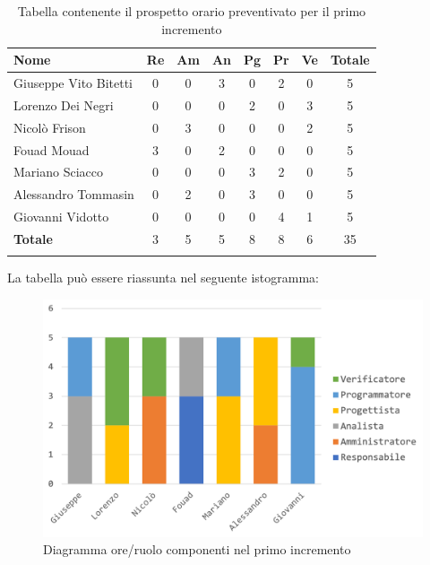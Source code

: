 			\begin{longtable}{|l|c|c|c|c|c|c|c|}
				\hline
				\rowcolor{lighter-grayer}
				\textbf{Nome} & \textbf{Re} & \textbf{Am} & \textbf{An} & \textbf{Pg}  & \textbf{Pr}   & \textbf{Ve} & \textbf{Totale} \\
				\hline
				\endfirsthead
				
				\hline
				Giuseppe Vito Bitetti 		 & 0 & 0 & 3 & 0 & 2 & 0 & 5\\
				\hline
				\hline
				Lorenzo Dei Negri			 & 0 & 0 & 0 & 2 & 0 & 3 & 5\\
				\hline
				\hline
				Nicolò Frison				    & 0 & 3 & 0 & 0 & 0 & 2 & 5\\
				\hline
				\hline
				Fouad Mouad 				 & 3 & 0 & 2 & 0 & 0 & 0 & 5\\
				\hline
				\hline
				Mariano Sciacco 			 & 0 & 0 & 0 & 3 & 2 & 0 & 5\\
				\hline
				\hline
				Alessandro Tommasin     & 0 & 2 & 0 & 3 & 0 & 0 & 5\\
				\hline
				\hline
				Giovanni Vidotto 			 & 0 & 0 & 0 & 0 & 4 & 1 & 5\\
				\hline 
				\textbf{Totale}			 		& 3 & 5 & 5 & 8 & 8 & 6 & 35\\
				\hline
				\caption{Tabella contenente il prospetto orario preventivato per il primo incremento}
			\end{longtable}
			\pagebreak
			
			La tabella può essere riassunta nel seguente istogramma:
			\begin{figure}[H]
				\centering
				\includegraphics[width=0.8\linewidth]{./images/preventivo/incremento1-1.png}
				\caption{Diagramma ore/ruolo componenti nel primo incremento}
				\label{fig:diagramma suddivione ruoli incremento I}
			\end{figure}
		
